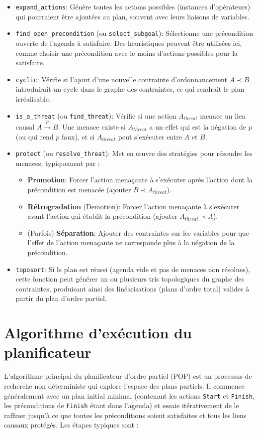\documentclass[a4paper,12pt]{report}
\begin{document}
\begin{itemize}
    \item \texttt{expand\_actions}: Génère toutes les actions possibles (instances d'opérateurs) qui pourraient être ajoutées au plan, souvent avec leurs liaisons de variables.
    \item \texttt{find\_open\_precondition} (ou \texttt{select\_subgoal}): Sélectionne une précondition ouverte de l'agenda à satisfaire. Des heuristiques peuvent être utilisées ici, comme choisir une précondition avec le moins d'actions possibles pour la satisfaire.
    \item \texttt{cyclic}: Vérifie si l'ajout d'une nouvelle contrainte d'ordonnancement \(A \prec B\) introduirait un cycle dans le graphe des contraintes, ce qui rendrait le plan irréalisable.
    \item \texttt{is\_a\_threat} (ou \texttt{find\_threat}): Vérifie si une action \(A_{threat}\) menace un lien causal \(A \xrightarrow{p} B\). Une menace existe si \(A_{threat}\) a un effet qui est la négation de \(p\) (ou qui rend \(p\) faux), et si \(A_{threat}\) peut s'exécuter entre \(A\) et \(B\).
    \item \texttt{protect} (ou \texttt{resolve\_threat}): Met en œuvre des stratégies pour résoudre les menaces, typiquement par :
        \begin{itemize}
            \item \textbf{Promotion}: Forcer l'action menaçante à s'exécuter après l'action dont la précondition est menacée (ajouter \(B \prec A_{threat}\)).
            \item \textbf{Rétrogradation} (Demotion): Forcer l'action menaçante à s'exécuter avant l'action qui établit la précondition (ajouter \(A_{threat} \prec A\)).
            \item (Parfois) \textbf{Séparation}: Ajouter des contraintes sur les variables pour que l'effet de l'action menaçante ne corresponde plus à la négation de la précondition.
        \end{itemize}
    \item \texttt{toposort}: Si le plan est réussi (agenda vide et pas de menaces non résolues), cette fonction peut générer un ou plusieurs tris topologiques du graphe des contraintes, produisant ainsi des linéarisations (plans d'ordre total) valides à partir du plan d'ordre partiel.
\end{itemize}

\section{Algorithme d'exécution du planificateur}
L'algorithme principal du planificateur d'ordre partiel (POP) est un processus de recherche non déterministe qui explore l'espace des plans partiels. Il commence généralement avec un plan initial minimal (contenant les actions \texttt{Start} et \texttt{Finish}, les préconditions de \texttt{Finish} étant dans l'agenda) et essaie itérativement de le raffiner jusqu'à ce que toutes les préconditions soient satisfaites et tous les liens causaux protégés. Les étapes typiques sont :
\end{document}
